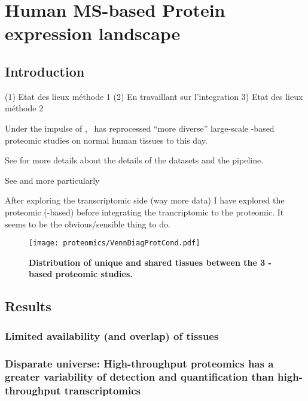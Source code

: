 \chapter{Human MS-based Protein expression landscape}
\label{ch:proteomics}

\section{Introduction}


(1) Etat des lieux méthode 1
(2) En travaillant sur l'integration 
3) Etat des lieux méthode 2



Under the impulse of \jyoti, \james\ has reprocessed \enquote{more diverse}
large-scale \ms-based proteomic studies on normal human tissues to this day.

See  for more details about the details of the datasets and
the pipeline.

See  and more particularly 

After exploring the transcriptomic side (way more data) I have explored the
proteomic (\ms-based) before integrating the trancriptomic to the proteomic.
It seems to be the obvious/sensible thing to do.

\begin{figure}[htpb]
    \texttt{[image: proteomics/VennDiagProtCond.pdf]}\centering
    \caption[Distribution of unique shared tissues between
    the 3 MS-based proteomic studies]{\label{VennDiagProt3}\textbf{Distribution
    of unique and shared tissues between the 3 \ms{}-based proteomic studies.}}
\end{figure}

\section{Results}

\subsection{Limited availability (and overlap) of tissues}




\subsection{Disparate universe: High-throughput proteomics has a greater
variability of detection and quantification than high-throughput transcriptomics}


